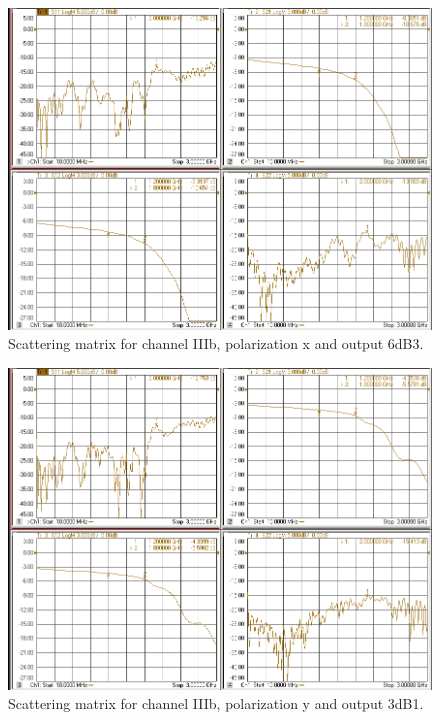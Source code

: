 \documentclass[12pt,a4paper,oneside]{article}
\begin{document}
\begin{figure}[H]
\centering
\includegraphics[width=0.9\linewidth]{VNA_results/IIIbx_6dB3.png}
\caption{Scattering matrix for channel IIIb, polarization x and output 6dB3.}
\label{fig:IIIbx_6dB3}
\end{figure}


\begin{figure}[H]
\centering
\includegraphics[width=0.9\linewidth]{VNA_results/IIIby_3dB1.png}
\caption{Scattering matrix for channel IIIb, polarization y and output 3dB1.}
\label{fig:IIIby_3dB1}
\end{figure}
\end{document}
